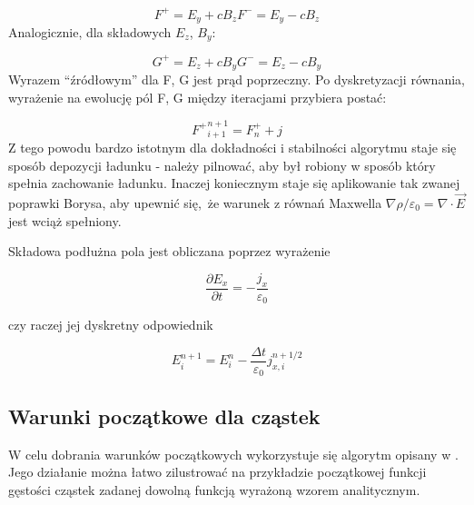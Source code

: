 \begin{equation}
    F^{+} = E_y + c B_z
    F^{-} = E_y - c B_z
    \label{eqn:Birdsall-electromagnetic-quantities}
\end{equation}
Analogicznie, dla składowych $E_z$, $B_y$:

\begin{equation}
    G^{+} = E_z + c B_y
    G^{-} = E_z - c B_y
    \label{eqn:Birdsall-electromagnetic-quantities-alternate-axes}
\end{equation}
Wyrazem ``źródłowym'' dla F, G jest prąd poprzeczny. Po dyskretyzacji
równania, wyrażenie na ewolucję pól F, G między iteracjami przybiera
postać:

\begin{equation}
    {F^{+}}^{n+1}_{i+1} = F^{+}_{n} + j
\end{equation}
Z tego powodu bardzo istotnym dla dokładności i stabilności algorytmu staje
się sposób depozycji ładunku - należy pilnować, aby był robiony w sposób
który spełnia zachowanie ładunku. Inaczej koniecznym staje się aplikowanie
tak zwanej poprawki Borysa, 
aby upewnić się, że warunek z równań Maxwella $\nabla \rho / \varepsilon_0
= \nabla \cdot \vec{E}$ jest wciąż spełniony.

Składowa podłużna pola jest obliczana poprzez wyrażenie

\begin{equation}
\frac{\partial E_x}{\partial t} = - \frac{j_x}{\varepsilon_0}
\label{longitudinal-field-differential}
\end{equation}

czy raczej jej dyskretny odpowiednik

\begin{equation}
    E_i^{n+1} = E_i^n - \frac{\Delta t}{\varepsilon_0} j_{x,i}^{n+1/2}
\label{longitudinal-field-finite-differential}
\end{equation}


\subsection{Warunki początkowe dla cząstek}

W celu dobrania warunków początkowych wykorzystuje się algorytm opisany w
\cite{birdsall}. Jego działanie można łatwo zilustrować na
przykładzie początkowej funkcji gęstości cząstek zadanej dowolną funkcją
wyrażoną wzorem analitycznym.

